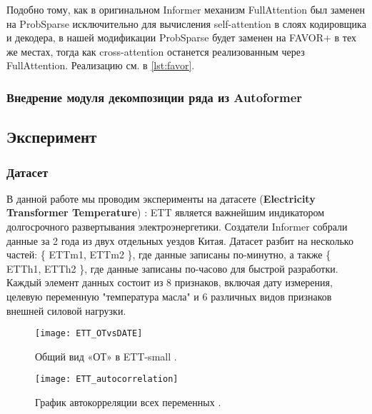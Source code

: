 Подобно тому, как в оригинальном Informer механизм FullAttention был заменен на 
ProbSparse исключительно для вычисления self-attention в слоях кодировщика и 
декодера, в нашей модификации ProbSparse будет заменен на FAVOR+ в тех же местах, 
тогда как cross-attention останется реализованным через FullAttention. 
Реализацию см. в \ref{lst:favor}.


\subsubsection{Внедрение модуля декомпозиции ряда из Autoformer}



\subsection{Эксперимент}

\subsubsection{Датасет}

В данной работе мы проводим эксперименты на датасете 
(\textbf{Electricity Transformer Temperature}) \cite{informer}:
ETT является важнейшим индикатором долгосрочного развертывания 
электроэнергетики. Создатели Informer собрали данные за 
2 года из двух отдельных уездов Китая. Датасет разбит на несколько 
частей: \{ ETTm1, ETTm2 \}, где данные записаны по-минутно, а 
также \{ ETTh1, ETTh2 \}, где данные записаны по-часово 
для быстрой разработки. Каждый элемент данных состоит из 
8 признаков, включая дату измерения, целевую переменную 
"температура масла" и 6 различных видов признаков внешней силовой 
нагрузки.  

\begin{figure}[h!]
    \centering
    \texttt{[image: ETT\_OTvsDATE]}
    \caption{Общий вид «ОТ» в ETT-small \cite{informer}.}
    \label{fig:ETT_OTvsDATE}
\end{figure}

\begin{figure}[h!]
    \centering
    \texttt{[image: ETT\_autocorrelation]}
    \caption{График автокорреляции всех переменных \cite{informer}.}
    \label{fig:ETT_autocorrelation}
\end{figure}

